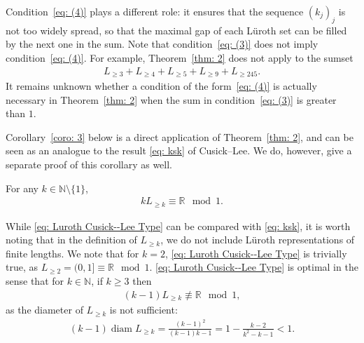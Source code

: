 \documentclass{ws-ijnt}
\begin{document}
	Condition~\eqref{eq: (4)} plays a different role: it ensures that the sequence \((k_j)_j\) is not too widely spread, so that the maximal gap of each L\"uroth set can be filled by the next one in the sum. Note that condition~\eqref{eq: (3)} does not imply condition~\eqref{eq: (4)}. For example, Theorem~\ref{thm: 2} does not apply to the sumset
	\begin{align*}
		L_{\geq 3} + L_{\geq 4} + L_{\geq 5} + L_{\geq 9} + L_{\geq 245}.
	\end{align*}
	It remains unknown whether a condition of the form~\eqref{eq: (4)} is actually necessary in Theorem~\ref{thm: 2} when the sum in condition~\eqref{eq: (3)} is greater than \(1\).
	
	Corollary~\ref{coro: 3} below is a direct application of Theorem~\ref{thm: 2}, and can be seen as an analogue to the result \eqref{eq: ksk} of Cusick--Lee. We do, however, give a separate proof of this corollary as well. 
	\begin{corollary}\label{coro: 3}
		For any $k\in\mathbb{N}\setminus\{1\}$, 
		\begin{align}\label{eq: Luroth Cusick--Lee Type}
			k L_{\geq k} \equiv \mathbb{R} \mod 1.
		\end{align}
	\end{corollary}
	While \eqref{eq: Luroth Cusick--Lee Type} can be compared with \eqref{eq: ksk}, it is worth noting that in the definition of $L_{\geq k}$, we do not include L\"uroth representations of finite lengths. We note that for $k=2$, \eqref{eq: Luroth Cusick--Lee Type} is trivially true, as $L_{\geq 2}=(0,1] \equiv \mathbb{R} \mod 1$. \eqref{eq: Luroth Cusick--Lee Type} is optimal in the sense that for $k\in\mathbb{N}$, if $k\geq3$ then
	\begin{align*}
		(k-1) L_{\geq k} \not\equiv \mathbb{R} \mod 1,
	\end{align*}
	as the diameter of $L_{\geq k}$ is not sufficient:
	\begin{align*}
		(k-1)\operatorname{diam}{L_{\geq k}}=\frac{(k-1)^2}{(k-1)k-1}=1-\frac{k-2}{k^2-k-1}<1.
	\end{align*}
	
\end{document}
